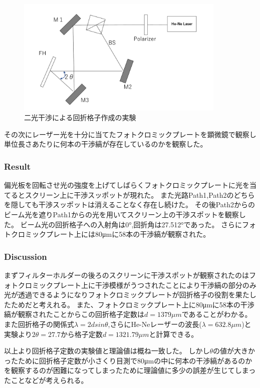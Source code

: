 \documentclass[11pt, a4paper]{jsarticle}
\begin{document}
\begin{figure}[htbp]
 \begin{center}
  \includegraphics[width=100mm]{fig22.png}
 \end{center}
 \caption{二光干渉による回折格子作成の実験}
 \label{fig:22}
\end{figure}

その次にレーザー光を十分に当てたフォトクロミックプレートを顕微鏡で観察し単位長さあたりに何本の干渉縞が存在しているのかを観察した。

\subsubsection{Result}
偏光板を回転させ光の強度を上げてしばらくフォトクロミックプレートに光を当てるとスクリーン上に干渉スッポットが現れた。
また光路Path1,Path2のどちらを隠しても干渉スッポットは消えることなく存在し続けた。
その後Path2からのビーム光を遮りPath1からの光を用いてスクリーン上の干渉スポットを観察した。
ビーム光の回折格子への入射角は0°,回折角は27.512°であった。
さらにフォトクロミックプレート上には80μmに58本の干渉縞が観察された。

\subsubsection{Discussion}
まずフィルターホルダーの後ろのスクリーンに干渉スポットが観察されたのはフォトクロミックプレート上に干渉模様がうつされたことにより干渉縞の部分のみ光が透過できるようになりフォトクロミックプレートが回折格子の役割を果たしたためだと考えれる。
また、フォトクロミックプレート上に80μmに58本の干渉縞が観察されたことからこの回折格子定数は$d = 1379μm$であることがわかる。
また回折格子の関係式$\lambda = 2dsin\theta$,さらにHe-Neレーザーの波長($\lambda = 632.8\mu m$)と実験より$2 \theta = 27.7$から格子定数$d =1321.79μm$と計算できる。

以上より回折格子定数の実験値と理論値は概ね一致した。
しかし$\theta$の値が大きかったために回折格子定数が小さくり目測で80μmの中に何本の干渉縞があるのかを観察するのが困難になってしまったために理論値に多少の誤差が生じてしまったことなどが考えられる。
\end{document}
